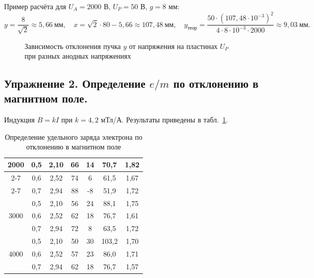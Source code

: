 \documentclass[12pt, a4paper]{article}
\begin{document}
	Пример расчёта для $U_A = 2000$ В, $U_P = 50$ В, $g = 8$ мм:
	\[
	y = \frac{8}{\sqrt{2}} \approx 5{,}66\ \text{мм}, \quad x = \sqrt{2}\cdot 80 - 5{,}66 \approx 107{,}48\ \text{мм}, \quad y_{\text{теор}} = \frac{50\cdot(107{,}48\cdot 10^{-3})^2}{4\cdot 8\cdot 10^{-3}\cdot 2000} \approx 9{,}03\ \text{мм}.
	\]
	
	\begin{figure}[H]
		\centering
		\caption{Зависимость отклонения пучка $y$ от напряжения на пластинах $U_P$ при разных анодных напряжениях}
		\label{fig:y-up}
	\end{figure}
	
	\subsection{Упражнение 2. Определение $e/m$ по отклонению в магнитном поле.}
	Индукция $B = kI$ при $k = 4{,}2$ мТл/А. Результаты приведены в табл.~\ref{tab:ex2}.
	
	\begin{table}[H]
		\caption{Определение удельного заряда электрона по отклонению в магнитном поле}
		\label{tab:ex2}
		\centering
		\small
		\begin{tabular}{|c|c|c|c|c|c|c|}
			\hline
			\multirow{3}{*}{2000} & 0,5 & 2,10 & 66 & 14 & 70,7 & 1,82 \\ \cline{2-7}
			& 0,6 & 2,52 & 74 & 6 & 61,5 & 1,67 \\ \cline{2-7}
			& 0,7 & 2,94 & 88 & -8 & 51,9 & 1,72 \\ \hline
			\multirow{3}{*}{3000} & 0,5 & 2,10 & 56 & 24 & 88,1 & 1,75 \\ \cline{2-7}
			& 0,6 & 2,52 & 62 & 18 & 76,7 & 1,61 \\ \cline{2-7}
			& 0,7 & 2,94 & 72 & 8 & 63,5 & 1,72 \\ \hline
			\multirow{3}{*}{4000} & 0,5 & 2,10 & 50 & 30 & 103,2 & 1,70 \\ \cline{2-7}
			& 0,6 & 2,52 & 57 & 23 & 86,0 & 1,71 \\ \cline{2-7}
			& 0,7 & 2,94 & 62 & 18 & 76,7 & 1,57 \\ \hline
		\end{tabular}
	\end{table}
	
\end{document}
